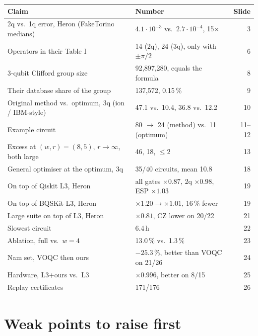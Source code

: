 \documentclass[11pt,a4paper]{article}
\begin{document}
\begin{center}\small\renewcommand{\arraystretch}{1.2}
\begin{tabularx}{\textwidth}{@{}L l r@{}}
\toprule
Claim & Number & Slide\\
\midrule
2q vs.\ 1q error, Heron (FakeTorino medians) & $4.1\cdot10^{-3}$ vs.\ $2.7\cdot10^{-4}$, 15$\times$ & 3\\
Operators in their Table I & 14 (2q), 24 (3q), only with $\pm\pi/2$ & 6\\
3-qubit Clifford group size & 92,897,280, equals the formula & 8\\
Their database share of the group & 137,572, 0.15\,\% & 9\\
Original method vs.\ optimum, 3q (ion / IBM-style) & 47.1 vs.\ 10.4, 36.8 vs.\ 12.2 & 10\\
Example circuit & 80 $\to$ 24 (method) vs.\ 11 (optimum) & 11--12\\
Excess at $(w,r)=(8,5)$, $r\to\infty$, both large & 46, 18, $\le2$ & 13\\
General optimiser at the optimum, 3q & 35/40 circuits, mean 10.8 & 18\\
On top of Qiskit L3, Heron & all gates $\times0.87$, 2q $\times0.98$, ESP $\times1.03$ & 19\\
On top of BQSKit L3, Heron & $\times1.20\to\times1.01$, 16\,\% fewer & 19\\
Large suite on top of L3, Heron & $\times0.81$, CZ lower on 20/22 & 21\\
Slowest circuit & 6.4\,h & 22\\
Ablation, full vs.\ $w=4$ & 13.0\,\% vs.\ 1.3\,\% & 23\\
Nam set, VOQC then ours & $-25.3\,\%$, better than VOQC on 21/26 & 24\\
Hardware, L3+ours vs.\ L3 & $\times0.996$, better on 8/15 & 25\\
Replay certificates & 171/176 & 26\\
\bottomrule
\end{tabularx}
\end{center}

\section{Weak points to raise first}
\end{document}

